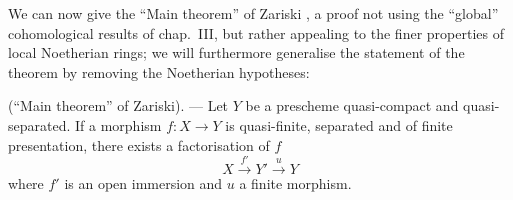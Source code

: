 \begin{env}[8.12.5]
\label{IV.8.12.5}
We can now give the ``Main theorem'' of Zariski , a proof not using the ``global'' cohomological results of chap.~III, but rather appealing to the finer properties of local Noetherian rings; we will furthermore generalise the statement of the theorem by removing the Noetherian hypotheses:
\end{env}

\begin{theorem}[8.12.6]
\label{IV.8.12.6}
(``Main theorem'' of Zariski). --- Let $Y$ be a prescheme quasi-compact and quasi-separated.
If a morphism $f:X\to Y$ is quasi-finite, separated and of finite presentation, there exists a factorisation of $f$
\begin{equation}
\label{IV.8.12.6.1}
X\xrightarrow{f'}Y'\xrightarrow{u}Y \tag{8.12.6.1}
\end{equation}
where $f'$ is an open immersion and $u$ a finite morphism.
\end{theorem}


